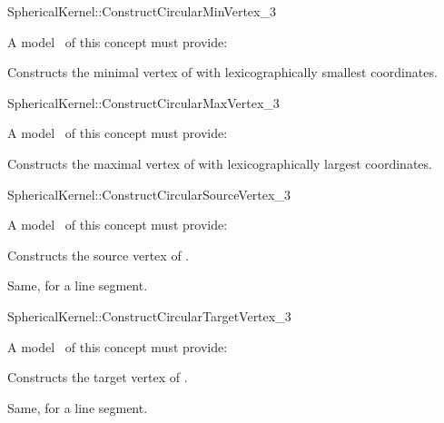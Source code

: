 \begin{ccRefFunctionObjectConcept}{SphericalKernel::ConstructCircularMinVertex_3} 


A model \ccVar\ of this concept must provide:


{Constructs the minimal vertex of  with lexicographically 
smallest coordinates.}

\end{ccRefFunctionObjectConcept}
\begin{ccRefFunctionObjectConcept}{SphericalKernel::ConstructCircularMaxVertex_3} 


A model \ccVar\ of this concept must provide:


{Constructs the maximal vertex of  with lexicographically 
largest coordinates.}

\end{ccRefFunctionObjectConcept}
\begin{ccRefFunctionObjectConcept}{SphericalKernel::ConstructCircularSourceVertex_3} 


A model \ccVar\ of this concept must provide:

{Constructs the source vertex of .}

{Same, for a line segment.}

\end{ccRefFunctionObjectConcept}
\begin{ccRefFunctionObjectConcept}{SphericalKernel::ConstructCircularTargetVertex_3} 


A model \ccVar\ of this concept must provide:

{Constructs the target vertex of .}

{Same, for a line segment.}

\end{ccRefFunctionObjectConcept}
